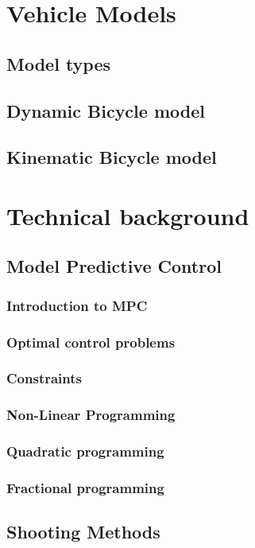 \documentclass{article}
\begin{document}
\begin{titlepage}
    \section{Vehicle Models}
    \subsection{Model types}
    \subsection{Dynamic Bicycle model}
    \subsection{Kinematic Bicycle model}

    \section{Technical background}
    \subsection{Model Predictive Control}
    \subsubsection{Introduction to MPC}
    \subsubsection{Optimal control problems}
    \subsubsection{Constraints}
    \subsubsection{Non-Linear Programming}
    \subsubsection{Quadratic programming}
    \subsubsection{Fractional programming}
    \subsection{Shooting Methods}

\end{titlepage}
\end{document}
